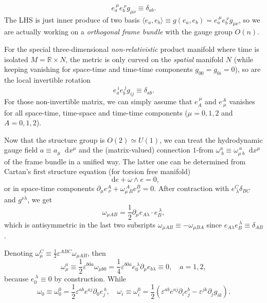 \documentclass[10pt,nofootinbib,letterpaper]{revtex4}
\newcommand*\dd{\mathop{}\!\mathrm{d}}
\begin{document}
		\begin{equation*}
			e_a^{~\mu}e_b^{~\nu}g_{\mu\nu}\equiv\delta_{ab}.
		\end{equation*}
		The LHS is just inner produce of two basis $\langle e_a,e_b\rangle\equiv g(e_a,e_b)=e_a^{~\mu}e_b^{~\nu}g_{\mu\nu}$, so we are actually working on a \emph{orthogonal frame bundle} with the gauge group $O(n)$.\par
		For the special three-dimensional \emph{non-relativistic} product manifold where time is isolated $M=\mathbb{R}\times N$, the metric is only curved on the \emph{spatial} manifold $N$ (while keeping vanishing for space-time and time-time components $g_{00}=g_{0i}=0$), so are the local invertible rotation
		\begin{equation}\label{2.2.5}
			e_a^{~i}e_b^{~j}g_{ij}\equiv\delta_{ab}.
		\end{equation}
		For those non-invertible matrix, we can simply assume that $e_A^{~\mu}$ and $e^A_{~\mu}$ vanishes for all space-time, time-space and time-time components ($\mu=0,1,2$ and $A=0,1,2$).\par
		Now that the structure group is $O(2)\simeq U(1)$, we can treat the hydrodynamic gauge field $a\equiv a_\mu\dd x^\mu$ and the (matrix-valued) connection $1$-from $\omega^a_{~b}\equiv\omega_{\mu~b}^{~a}\dd x^\mu$ of the frame bundle in a unified way. The latter one can be determined from Cartan's first structure equation (for torsion free manifold)
		\begin{equation*}
			\dd e+\omega\wedge e=0,
		\end{equation*}
		or in space-time components $\partial_\mu e^A_{~\nu}+\omega_{\mu~B}^{~A}e^B_{~\nu}=0$. After contraction with $e^C_{~\lambda}\delta_{BC}$ and $g^{\nu\lambda}$, we get
		\begin{equation*}
			\omega_{\mu AB}=\dfrac{1}{2}\partial_\mu e_{A\lambda}\cdot e_B^{~\lambda},
		\end{equation*}
		which is antisymmetric in the last two subsripts $\omega_{\mu AB}\equiv-\omega_{\mu BA}$ since $e_{A\lambda}e_B^{~\lambda}\equiv\delta_{AB}$.\par
		Denoting $\omega_\mu^C\equiv\frac{1}{2}\varepsilon^{ABC}\omega_{\mu AB}$, then
		\begin{equation*}
			\omega_\mu^a\equiv\dfrac{1}{2}\varepsilon^{b0a}\omega_{\mu b0}=\dfrac{1}{4}\varepsilon^{b0a}e_0^{~\lambda}\partial_\mu e_{b\lambda}\equiv0,\quad a=1,2,
		\end{equation*}
		because $e_0^{~\lambda}\equiv0$ by construction. While
		\begin{equation*}
			\omega_0\equiv\omega_0^0=\dfrac{1}{2}\varepsilon^{ab}e^{aj}\partial_0e_j^{~b},\quad\omega_i\equiv\omega_i^0=\dfrac{1}{2}(\varepsilon^{ab}e^{aj}\partial_i e_j^b- \varepsilon^{jk}\partial_j g_{ik}).
		\end{equation*}
\end{document}
